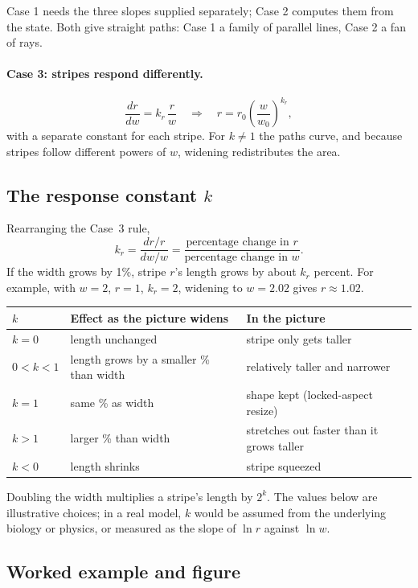 \documentclass[11pt]{article}
\begin{document}
Case 1 needs the three slopes supplied separately; Case 2 computes them from the state. Both give straight paths: Case 1 a family of parallel lines, Case 2 a fan of rays.

\paragraph{Case 3: stripes respond differently.}
\[
  \frac{dr}{dw} = k_r\,\frac{r}{w}
  \quad\Longrightarrow\quad
  r = r_0\left(\frac{w}{w_0}\right)^{k_r},
\]
with a separate constant for each stripe. For $k \neq 1$ the paths curve, and because stripes follow different powers of $w$, widening redistributes the area.

\subsection{The response constant \texorpdfstring{$k$}{k}}

Rearranging the Case~3 rule,
\[
  k_r = \frac{dr/r}{dw/w}
  = \frac{\text{percentage change in } r}{\text{percentage change in } w}.
\]
If the width grows by 1\%, stripe $r$'s length grows by about $k_r$ percent. For example, with $w=2$, $r=1$, $k_r=2$, widening to $w=2.02$ gives $r \approx 1.02$.

\begin{center}
\begin{tabular}{lll}
\toprule
$k$ & Effect as the picture widens & In the picture \\
\midrule
$k=0$ & length unchanged & stripe only gets taller \\
$0<k<1$ & length grows by a smaller \% than width & relatively taller and narrower \\
$k=1$ & same \% as width & shape kept (locked-aspect resize) \\
$k>1$ & larger \% than width & stretches out faster than it grows taller \\
$k<0$ & length shrinks & stripe squeezed \\
\bottomrule
\end{tabular}
\end{center}

Doubling the width multiplies a stripe's length by $2^k$. The values below are illustrative choices; in a real model, $k$ would be assumed from the underlying biology or physics, or measured as the slope of $\ln r$ against $\ln w$.

\subsection{Worked example and figure}
\end{document}
